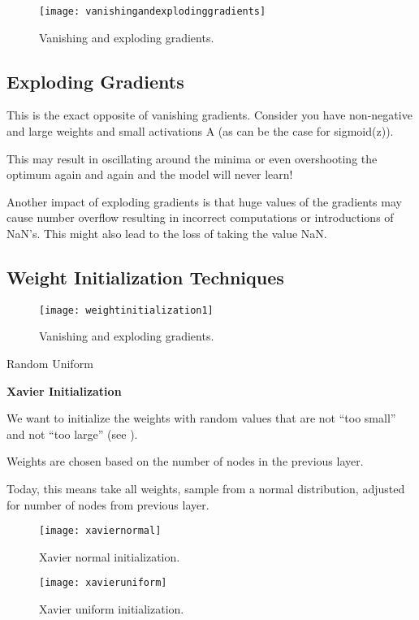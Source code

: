  	\begin{figure}[h]
		\centering
		\texttt{[image: vanishingandexplodinggradients]}
		\caption{Vanishing and exploding gradients.}
		\label{fig:vanishingandexplodinggradients}
	\end{figure}

	\subsection{Exploding Gradients}
This is the exact opposite of vanishing gradients.  Consider you have non-negative and large weights and small activations A (as can be the case for sigmoid(z)).

This may result in oscillating around the minima or even overshooting the optimum again and again and the model will never learn!

Another impact of exploding gradients is that huge values of the gradients may cause number overflow resulting in incorrect computations or introductions of NaN's.  This might also lead to the loss of taking the value NaN.

	\subsection{Weight Initialization Techniques}
 	\begin{figure}[h]
		\centering
		\texttt{[image: weightinitialization1]}
		\caption{Vanishing and exploding gradients.}
		\label{fig:weightinitialization1}
	\end{figure}

	\begin{bulletedlist}
		\item Random Uniform
		\item {\bfseries Xavier Initialization}
		\begin{bulletedlist}
			\item We want to initialize the weights with random values that are not ``too small'' and not ``too large'' (see \figurename{}).
			\item Weights are chosen based on the number of nodes in the previous layer.
			\item Today, this means take all weights, sample from a normal distribution, adjusted for number of nodes from previous layer.
		\end{bulletedlist}
	\end{bulletedlist}

	\begin{figure}[tbp]
		\begin{minipage}[t]{0.475\textwidth}
			\centering
			\texttt{[image: xaviernormal]}
			\caption{Xavier normal initialization.}
			\label{fig:xaviernormal}
		\end{minipage}
		\hfill
		\begin{minipage}[t]{0.475\textwidth}
			\centering
			\texttt{[image: xavieruniform]}
			\caption{Xavier uniform initialization.}
			\label{fig:xavieruniform}
		\end{minipage}
	\end{figure}

